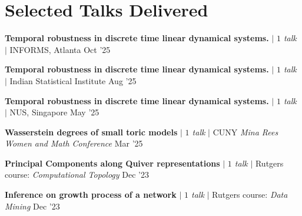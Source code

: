 \section{Selected Talks Delivered}
\resumeSubHeadingListStart

\resumeProjectHeading
{\textbf{Temporal robustness in discrete time linear dynamical systems.} $|$ \emph{$1$ talk} $|$ INFORMS, Atlanta}
{Oct '25}
{}
\vspace{\mygap}

\resumeProjectHeading
{\textbf{Temporal robustness in discrete time linear dynamical systems.} $|$ \emph{$1$ talk} $|$ Indian Statistical Institute}
{Aug '25}
{}
\vspace{\mygap}

\resumeProjectHeading
{\textbf{Temporal robustness in discrete time linear dynamical systems.} $|$ \emph{$1$ talk} $|$ NUS, Singapore}
{May '25}
{}
\vspace{\mygap}

\resumeProjectHeading
{\textbf{Wasserstein degrees of small toric models} $|$ \emph{$1$ talk} $|$ CUNY \textit{Mina Rees Women and Math Conference}}
{Mar '25}
{}
\vspace{\mygap}

\resumeProjectHeading
{\textbf{Principal Components along Quiver representations} $|$ \emph{$1$ talk} $|$ Rutgers course: \textit {Computational Topology}}
{Dec '23}
{}
\vspace{\mygap}

\resumeProjectHeading
{\textbf{Inference on growth process of a network} $|$ \emph{$1$ talk} $|$ Rutgers course: \textit{Data Mining}}
{Dec '23}
{}
\vspace{\mygap}

